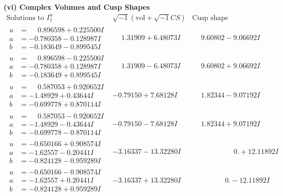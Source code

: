 \documentclass[1p]{elsarticle_modified}
\theoremstyle{definition}
\newcommand{\I}{\sqrt{-1}}
\begin{document}
\newpage\flushleft \textbf{(vi) Complex Volumes and Cusp Shapes}
$$\begin{array}{c|c|c}  
\text{Solutions to }I^u_{1}& \I (\text{vol} + \sqrt{-1}CS) & \text{Cusp shape}\\
 \hline 
\begin{aligned}
u &= \phantom{-}0.896598 + 0.225500 I \\
a &= -0.780358 - 0.128987 I \\
b &= -0.183649 - 0.899545 I\end{aligned}
 & \phantom{-}1.31909 + 6.48073 I & \phantom{-}9.60802 - 9.06692 I \\ \hline\begin{aligned}
u &= \phantom{-}0.896598 - 0.225500 I \\
a &= -0.780358 + 0.128987 I \\
b &= -0.183649 + 0.899545 I\end{aligned}
 & \phantom{-}1.31909 - 6.48073 I & \phantom{-}9.60802 + 9.06692 I \\ \hline\begin{aligned}
u &= \phantom{-}0.587053 + 0.920652 I \\
a &= -1.48929 + 0.43644 I \\
b &= -0.699778 + 0.870114 I\end{aligned}
 & -0.79150 + 7.68128 I & \phantom{-}1.82344 - 9.07192 I \\ \hline\begin{aligned}
u &= \phantom{-}0.587053 - 0.920652 I \\
a &= -1.48929 - 0.43644 I \\
b &= -0.699778 - 0.870114 I\end{aligned}
 & -0.79150 - 7.68128 I & \phantom{-}1.82344 + 9.07192 I \\ \hline\begin{aligned}
u &= -0.650166 + 0.908574 I \\
a &= -1.62557 - 0.20441 I \\
b &= -0.824128 - 0.959289 I\end{aligned}
 & -3.16337 - 13.32280 I & \phantom{-0.000000 -}0. + 12.11892 I \\ \hline\begin{aligned}
u &= -0.650166 - 0.908574 I \\
a &= -1.62557 + 0.20441 I \\
b &= -0.824128 + 0.959289 I\end{aligned}
 & -3.16337 + 13.32280 I & \phantom{-0.000000 } 0. - 12.11892 I \\ \hline\begin{aligned}

\end{aligned}
\end{array}$$
\end{document}
